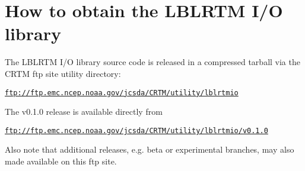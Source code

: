 \chapter{How to obtain the LBLRTM I/O library}
\label{chapter:get}

The LBLRTM I/O library source code is released in a compressed tarball via the CRTM ftp site utility directory:

\hspace{1cm}\href{ftp://ftp.emc.ncep.noaa.gov/jcsda/CRTM/utility/lblrtmio}{\texttt{ftp://ftp.emc.ncep.noaa.gov/jcsda/CRTM/utility/lblrtmio}}

The v0.1.0 release is available directly from

\hspace{1cm}\href{ftp://ftp.emc.ncep.noaa.gov/jcsda/CRTM/utility/lblrtmio/v0.1.0}{\texttt{ftp://ftp.emc.ncep.noaa.gov/jcsda/CRTM/utility/lblrtmio/v0.1.0}}

Also note that additional releases, e.g. beta or experimental branches, may also made available on this ftp site.

